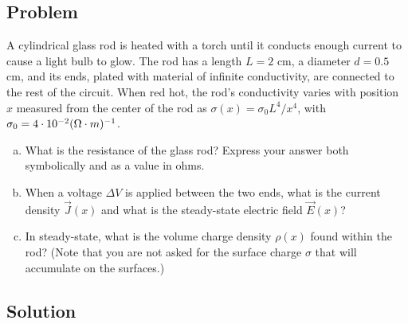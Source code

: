 \documentclass[solutions]{esg8022pset}
\renewcommand{\d}{\,d}
\begin{document}
\subsection{Problem}
  A cylindrical glass rod is heated with a torch until it conducts enough current to cause a light bulb to glow. The rod has a length $L = 2$ cm, a diameter $d = 0.5$ cm, and its ends, plated with material of infinite conductivity, are connected to the rest of the circuit. When red hot, the rod's conductivity varies with position $x$ measured from the center of the rod as $\sigma(x) = \sigma_0 L^4 / x^4$, with $\sigma_0 = 4 \cdot 10^{-2} (\Omega\cdot{\rm m})^{-1}$.
  \begin{enumerate}[(a)]
    \item What is the resistance of the glass rod? Express your answer both symbolically and as a value in ohms.
    \item When a voltage $\Delta V$ is applied between the two ends, what is the current density $\vec J(x)$ and what is the steady-state electric field $\vec E(x)$?
    \item In steady-state, what is the volume charge density $\rho(x)$ found within the rod? (Note that you are not asked for the surface charge $\sigma$ that will accumulate on the surfaces.)
  \end{enumerate}
\subsection{Solution}
\end{document}
